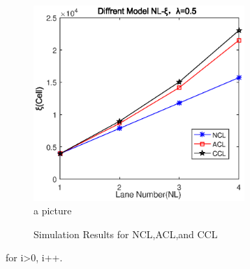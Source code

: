 \begin{figure}[H]
	\small
	\centering
	\includegraphics[width=8cm]{figure/421.eps}
	\caption{a picture} \label{fig:a picture}
\end{figure}

\begin{figure}[H]
	\centering
	\hspace{0cm}
	\caption{Simulation Results for NCL,ACL,and CCL}
	\label{figb} %
\end{figure}


\begin{Theorem}
	for i>0, i++.
\end{Theorem}

